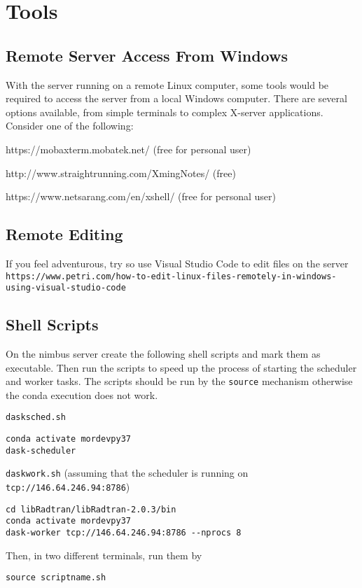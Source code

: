 \chapter{Tools}
\label{chap:Tools}

\section{Remote Server Access From Windows}
\label{sec:RemoteServerAccessFromWindows}

With the \libraddask{} server running on a remote Linux computer, some tools would be required to access the server from a local Windows computer.  There are several options available, from simple terminals to complex X-server applications.  Consider one of the following:


https://mobaxterm.mobatek.net/ (free for personal user) 

http://www.straightrunning.com/XmingNotes/ (free)

https://www.netsarang.com/en/xshell/ (free for personal user) 


\section{Remote Editing}
If you feel adventurous, try so use Visual Studio Code to edit files on the server\\
\lstinline{https://www.petri.com/how-to-edit-linux-files-remotely-in-windows-using-visual-studio-code } 

\section{Shell Scripts}

On the nimbus server create the following shell scripts and mark them as executable. Then run the scripts to speed up the process of starting the scheduler and worker tasks.  The scripts should be run by the \lstinline{source} mechanism otherwise the conda execution does not work.

\lstinline{dasksched.sh}
\begin{lstlisting}
conda activate mordevpy37
dask-scheduler
\end{lstlisting}

\lstinline{daskwork.sh} (assuming that the scheduler is running on \lstinline{tcp://146.64.246.94:8786})
\begin{lstlisting}
cd libRadtran/libRadtran-2.0.3/bin    
conda activate mordevpy37    
dask-worker tcp://146.64.246.94:8786 --nprocs 8
\end{lstlisting}

Then, in two different terminals, run them by
\begin{lstlisting}
source scriptname.sh
\end{lstlisting}
